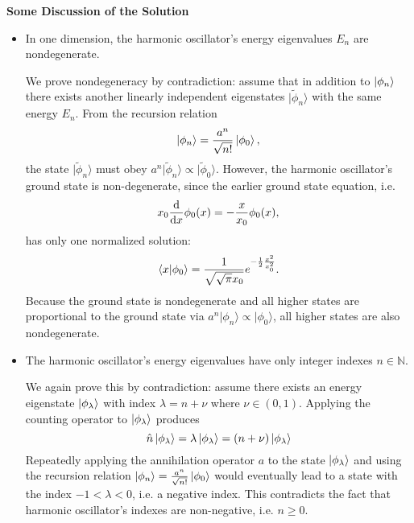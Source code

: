 \documentclass[11pt, a4paper]{article}
\renewcommand{\t}[1]{\tilde{#1}}
\newcommand{\bket}[1]{\big | {#1} \big \rangle }
\renewcommand{\k}[1]{\ket{#1}}
\newcommand{\bk}[1]{\bket{#1}}
\begin{document}
\textbf{Some Discussion of the Solution}
\begin{itemize}
	\item In one dimension, the harmonic oscillator's energy eigenvalues $ E_{n} $ are nondegenerate.

    \vspace{2mm}
    We prove nondegeneracy by contradiction: assume that in addition to $ \k{\phi_{n}} $ there exists another linearly independent eigenstates $ \bk{\t{\phi}_{n}} $ with the same energy $ E_{n} $. From the recursion relation
	\begin{equation*}
		\ket{\phi_{n}} = \frac{a^{n}}{\sqrt{n!}}\ket{\phi_{0}},
	\end{equation*}
	the state $ \bk{\t{\phi}_{n}} $ must obey $ a^{n}\bk{\t{\phi}_{n}} \propto \bk{\t{\phi}_{0}} $. However, the harmonic oscillator's ground state is non-degenerate, since the earlier ground state equation, i.e.
	\begin{equation*}
		x_{0} \dv{x} \phi_{0}(x) = - \frac{x}{x_{0}}\phi_{0}(x),
	\end{equation*}
	has only one normalized solution:
	\begin{equation*}
		\braket{x}{\phi_{0}} = \frac{1}{\sqrt{\sqrt{\pi}x_{0}}}e^{-\frac{1}{2}\frac{x^{2}}{x_{0}^{2}}}.
	\end{equation*}
	Because the ground state is nondegenerate and all higher states are proportional to the ground state via $  a^{n}\bk{\phi_{n}} \propto \bk{\phi_{0}}  $, all higher states are also nondegenerate.
	
	\item The harmonic oscillator's energy eigenvalues have only integer indexes $ n \in \mathbb{N} $. 

    \vspace{2mm}
    We again prove this by contradiction: assume there exists an energy eigenstate $ \k{\phi_{\lambda}} $ with index $ \lambda = n + \nu $ where $ \nu \in (0, 1) $. Applying the counting operator to $ \k{\phi_{\lambda}} $ produces
	\begin{equation*}
		\hat{n}\ket{\phi_{\lambda}} = \lambda \ket{\phi_{\lambda}} = (n + \nu)\ket{\phi_{\lambda}}
	\end{equation*}
	Repeatedly applying the annihilation operator $ a $ to the state $ \ket{\phi_{\lambda}} $ and using the recursion relation $ \ket{\phi_{n}} = \frac{a^{n}}{\sqrt{n!}}\ket{\phi_{0}} $ would eventually lead to a state with the index $ -1 < \lambda < 0 $, i.e. a negative index. This contradicts the fact that harmonic oscillator's indexes are non-negative, i.e. $ n \geq 0 $. 
\end{itemize}
\end{document}
